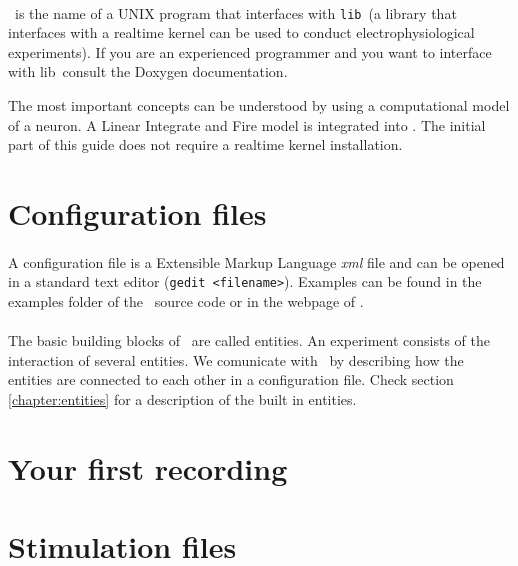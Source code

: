 \paragraph{}
\progname\ is the name of a UNIX program that interfaces with \texttt{lib\progname}\  (a library that interfaces with a realtime kernel can be used to conduct electrophysiological experiments). If you are an experienced programmer and you want to interface with lib\progname\, consult the Doxygen documentation.

The most important concepts can be understood by using a computational model of a neuron. A Linear Integrate and Fire model is integrated into \progname. The initial part of this guide does not require a realtime kernel installation. 

\section{Configuration files}

\paragraph{}
A configuration file is a Extensible Markup Language \emph{xml} file and can be opened in a standard text editor (\texttt{gedit <filename>}). Examples can be found in the examples folder of the \progname\ source code or in the webpage of \href{http://www.tnb.ua.ac.be}{\progname}.

\paragraph{}
The basic building blocks of \progname\ are called entities. An experiment consists of the interaction of several entities. We comunicate with \progname\ by describing how the entities are connected to each other in a configuration file. Check section \ref{chapter:entities} for a description of the built in entities.

\section{Your first recording}





\section{Stimulation files}
